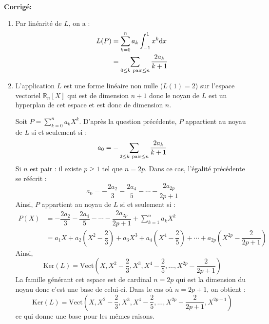 \documentclass[a4paper,twoside,french,11pt]{VcCours}
\newcommand{\dx}{\text{d}x}
\newcommand{\corr}{\textbf{Corrigé:}}
\begin{document}
\corr \begin{enumerate}
\item Par linéarité de $L$, on a :
\begin{align*}
L(P) & = \sum_{k=0}^n a_k \int_{-1}^{1} x^k \dx \\
& = \sum_{0 \leq k \hbox{ {\scriptsize pair}} \leq n} \dfrac{2a_k}{k+1} 
\end{align*}
\item L'application $L$ est une forme linéaire non nulle ($L(1)=2$) sur l'espace vectoriel $\mathbb{R}_n[X]$ qui est de dimension $n+1$ donc le noyau de $L$ est un hyperplan de cet espace et est donc de dimension $n$.



\noindent Soit $P= \sum_{k=0}^n a_k X^k$. D'après la question précédente, $P$ appartient au noyau de $L$ si et seulement si :
$$ a_0 = - \sum_{2 \leq k \hbox{ {\scriptsize pair}} \leq n} \dfrac{2a_k}{k+1}$$
Si $n$ est pair : il existe $p \geq 1$ tel que $n=2p$. Dans ce cas, l'égalité précédente se réécrit :
$$ a_0 = - \dfrac{2a_2}{3} - \dfrac{2a_4}{5} - \cdots - \dfrac{2a_{2p}}{2p+1}$$
Ainsi, $P$ appartient au noyau de $L$ si et seulement si :
\begin{align*}
P(X) & =  - \dfrac{2a_2}{3} - \dfrac{2a_4}{5} - \cdots - \dfrac{2a_{2p}}{2p+1} + \sum_{k=1}^n a_k X^k \\
& = a_1 X + a_2 \left(X^2   - \dfrac{2}{3} \right) + a_3 X^3 +  a_4 \left(X^4   - \dfrac{2}{5} \right) + \cdots +  a_{2p} \left(X^{2p}   - \dfrac{2}{2p+1} \right)
\end{align*}
Ainsi,
$$ \textrm{Ker}(L) = \textrm{Vect} \left(X,X^2   - \dfrac{2}{3},X^3,X^4   - \dfrac{2}{5}, \ldots, X^{2p}   - \dfrac{2}{2p+1} \right)$$
La famille générant cet espace est de cardinal $n=2p$ qui est la dimension du noyau donc c'est une base de celui-ci. Dans le cas où $n=2p+1$, on obtient :
$$ \textrm{Ker}(L) = \textrm{Vect} \left(X,X^2   - \dfrac{2}{3},X^3,X^4   - \dfrac{2}{5}, \ldots, X^{2p}   - \dfrac{2}{2p+1}, X^{2p+1} \right)$$
ce qui donne une base pour les mêmes raisons.

\end{enumerate}
\end{document}
